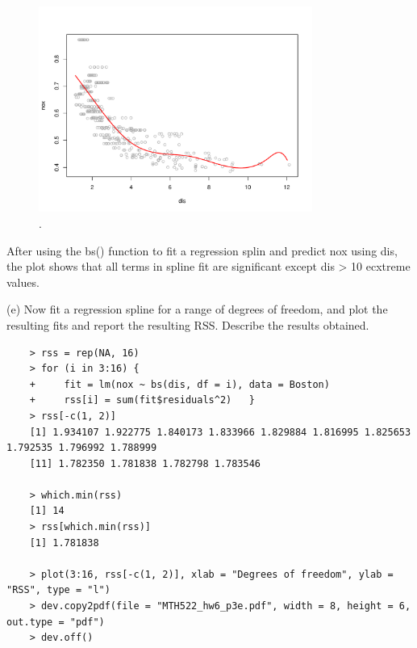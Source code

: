 \documentclass{article}
\begin{document}
\begin{figure}[htb]
	\begin{center}
		\includegraphics[width=0.8\textwidth]{MTH522_hw6_p3d.pdf}
	\end{center}
	\caption{.}
	\label{fig:MTH522_hw6_p3d}
\end{figure}

After using the bs() function to fit a regression splin and predict nox using dis, the plot shows that all terms in spline fit are significant except dis > 10 ecxtreme values.


\newpage


(e) Now fit a regression spline for a range of degrees of freedom, and plot the resulting fits and report the resulting RSS. Describe the results obtained.\\

\begin{program}
	\begin{verbatim}
	> rss = rep(NA, 16)
	> for (i in 3:16) {
	+     fit = lm(nox ~ bs(dis, df = i), data = Boston)
	+     rss[i] = sum(fit$residuals^2)   }
	> rss[-c(1, 2)]
	[1] 1.934107 1.922775 1.840173 1.833966 1.829884 1.816995 1.825653 1.792535 1.796992 1.788999
	[11] 1.782350 1.781838 1.782798 1.783546

	> which.min(rss)
	[1] 14
	> rss[which.min(rss)]
	[1] 1.781838

	> plot(3:16, rss[-c(1, 2)], xlab = "Degrees of freedom", ylab = "RSS", type = "l")
	> dev.copy2pdf(file = "MTH522_hw6_p3e.pdf", width = 8, height = 6, out.type = "pdf")
	> dev.off()
	\end{verbatim}
\end{program}
\end{document}

